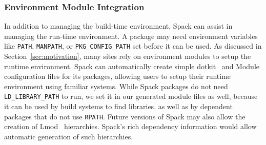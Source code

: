 \subsubsection{Environment Module Integration}
\label{sec:envmodule}
In addition to managing the build-time environment, Spack can assist in managing
the run-time environment.  A package may need environment variables like {\tt PATH},
{\tt MANPATH}, or {\tt PKG\_CONFIG\_PATH} set before it can be used.
As discussed in Section~\ref{sec:motivation}, many sites rely on environment
modules to setup the runtime environment.  Spack can automatically create simple
dotkit~\cite{dotkit} and Module configuration files for its packages, allowing
users to setup their runtime environment using familiar systems.  While Spack
packages do not need {\tt LD\_LIBRARY\_PATH} to run, we set it in our generated module
files as well, because it can be used by build systems to find libraries, as well
as by dependent packages that do not use {\tt RPATH}.
%
Future versions of Spack may also allow the creation of Lmod~\cite{mclay:lmod}
hierarchies.
Spack's rich dependency information would allow automatic generation of 
such hierarchies.
